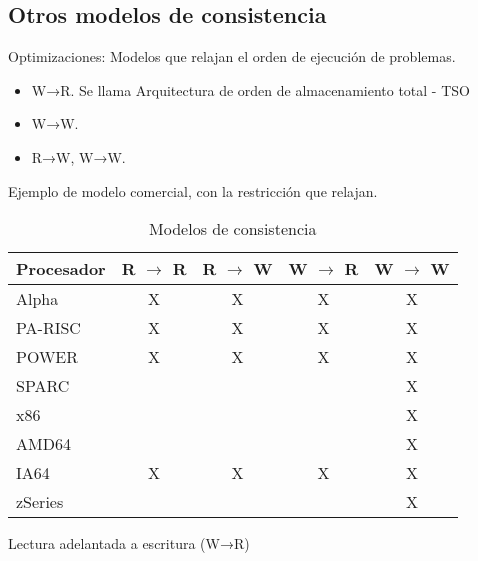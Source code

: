 \documentclass[12pt, twoside, openright]{report} %
\begin{document}
\subsection{Otros modelos de consistencia}


Optimizaciones: Modelos que relajan el orden de ejecución de
problemas.

\begin{itemize}

	\item W→R. Se llama Arquitectura de orden de almacenamiento total -
	      TSO
	\item W→W.
	\item R→W, W→W.
\end{itemize}

Ejemplo de modelo comercial, con la restricción que relajan.
\begin{table}[H]
	\centering
	\begin{tabular}{l|c|c|c|c}
		\textbf{Procesador} & \multicolumn{1}{l|}{R $\rightarrow$ R} & \multicolumn{1}{l|}{R $\rightarrow$ W} & \multicolumn{1}{l|}{W $\rightarrow$ R} & \multicolumn{1}{l}{W $\rightarrow$ W} \\ \hline
		Alpha               & X                                      & X                                      & X                                      & X                                     \\ \hline
		PA-RISC             & X                                      & X                                      & X                                      & X                                     \\ \hline
		POWER               & X                                      & X                                      & X                                      & X                                     \\ \hline
		SPARC               &                                        &                                        &                                        & X                                     \\ \hline
		x86                 &                                        &                                        &                                        & X                                     \\ \hline
		AMD64               &                                        &                                        &                                        & X                                     \\ \hline
		IA64                & X                                      & X                                      & X                                      & X                                     \\ \hline
		zSeries             &                                        &                                        &                                        & X                                     \\ \hline
	\end{tabular}
	\caption{Modelos de consistencia}
\end{table}
\pagebreak
Lectura adelantada a escritura (W→R)
\end{document}
